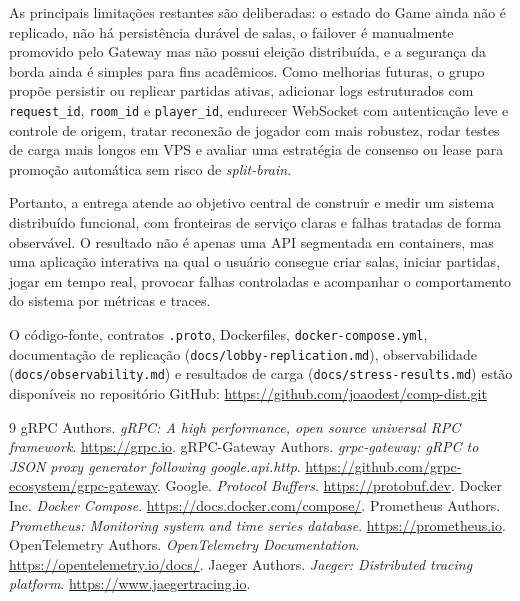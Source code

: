 \documentclass[portuguese]{sbcreviews-2025}%
\begin{document}
As principais limitações restantes são deliberadas: o estado do Game ainda não é replicado, não há persistência durável de salas, o failover é manualmente promovido pelo Gateway mas não possui eleição distribuída, e a segurança da borda ainda é simples para fins acadêmicos. Como melhorias futuras, o grupo propõe persistir ou replicar partidas ativas, adicionar logs estruturados com \texttt{request\_id}, \texttt{room\_id} e \texttt{player\_id}, endurecer WebSocket com autenticação leve e controle de origem, tratar reconexão de jogador com mais robustez, rodar testes de carga mais longos em VPS e avaliar uma estratégia de consenso ou lease para promoção automática sem risco de \textit{split-brain}.

Portanto, a entrega atende ao objetivo central de construir e medir um sistema distribuído funcional, com fronteiras de serviço claras e falhas tratadas de forma observável. O resultado não é apenas uma API segmentada em containers, mas uma aplicação interativa na qual o usuário consegue criar salas, iniciar partidas, jogar em tempo real, provocar falhas controladas e acompanhar o comportamento do sistema por métricas e traces.

\begin{declarations}

\begin{materials}
O código-fonte, contratos \texttt{.proto}, Dockerfiles, \texttt{docker-compose.yml}, documentação de replicação (\texttt{docs/lobby-replication.md}), observabilidade (\texttt{docs/observability.md}) e resultados de carga (\texttt{docs/stress-results.md}) estão disponíveis no repositório GitHub: \url{https://github.com/joaodest/comp-dist.git}
\end{materials}

\end{declarations}

\begin{thebibliography}{9}
 gRPC Authors. \textit{gRPC: A high performance, open source universal RPC framework}. \url{https://grpc.io}.
 gRPC-Gateway Authors. \textit{grpc-gateway: gRPC to JSON proxy generator following google.api.http}. \url{https://github.com/grpc-ecosystem/grpc-gateway}.
 Google. \textit{Protocol Buffers}. \url{https://protobuf.dev}.
 Docker Inc. \textit{Docker Compose}. \url{https://docs.docker.com/compose/}.
 Prometheus Authors. \textit{Prometheus: Monitoring system and time series database}. \url{https://prometheus.io}.
 OpenTelemetry Authors. \textit{OpenTelemetry Documentation}. \url{https://opentelemetry.io/docs/}.
 Jaeger Authors. \textit{Jaeger: Distributed tracing platform}. \url{https://www.jaegertracing.io}.
\end{thebibliography}
\end{document}
